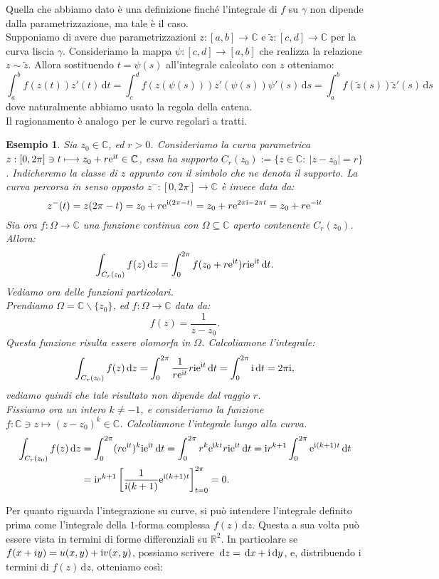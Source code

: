 \documentclass[11pt]{book}
\theoremstyle{Definizione}
\theoremstyle{TeoremaProposizioneLemmaCorollarioCongettura}
\theoremstyle{OsservazioneNotaEsempio}
\newtheorem{myes}{Esempio}[section]
\newcommand{\R}{\mathbb{R}}
\newcommand{\C}{\mathbb{C}}
\newcommand{\tolto}{\smallsetminus}
\renewcommand{\i}{\textup{i}}
\newcommand{\e}{\textup{e}}
\renewcommand{\d}{\mathrm{d}}
\newcommand{\dz}{\,\d z}
\newcommand{\dt}{\,\d t}
\newcommand{\ds}{\,\d s}
\newcommand{\dx}{\,\d x}
\newcommand{\dy}{\,\d y}
\begin{document}
\noindent
Quella che abbiamo dato è una definizione finché l'integrale di $f$ su $\gamma$ non dipende dalla parametrizzazione, ma tale è il caso.\\
Supponiamo di avere due parametrizzazioni $z:[a,b]\longrightarrow \C$ e $\widetilde{z}:[c,d]\longrightarrow \C$ per la curva liscia $\gamma$. Consideriamo la mappa $\psi:[c,d]\longrightarrow [a,b]$ che realizza la relazione $z\sim \widetilde{z}$. Allora sostituendo $t = \psi(s)$ all'integrale calcolato con $z$ otteniamo:
$$
\int_a^b f(z(t))z'(t) \dt = \int_c^d f(z(\psi(s)))z'(\psi(s))\psi'(s)\ds = \int_a^b f(\widetilde{z}(s)) \widetilde{z}'(s) \ds
$$
dove naturalmente abbiamo usato la regola della catena.\\
Il ragionamento è analogo per le curve regolari a tratti.
\begin{myes}
Sia $z_0\in \C$, ed $r > 0$. Consideriamo la curva parametrica $z:[0,2\pi]\ni t \longmapsto z_0 + r \e^{\i t}\in \C$, essa ha supporto $C_r(z_0) := \{z\in \C:\ |z-z_0| = r\}$. Indicheremo la classe di $z$ appunto con il simbolo che ne denota il supporto. La curva percorsa in senso opposto $z^-:[0,2\pi]\longrightarrow \C$ è invece data da:
$$
z^-(t) = z(2\pi-t) = z_0 + r\e^{\i(2\pi-t)} = z_0 + r\e^{2\pi\i - 2\pi t} = z_0+r\e^{-\i t}
$$
Sia ora $f:\Omega\longrightarrow \C$ una funzione continua con $\Omega\subseteq \C$ aperto contenente $C_r(z_0)$. Allora:
$$
\int_{C_r(z_0)} f(z)\dz = \int_{0}^{2\pi} f(z_0+r\e^{\i t}) r\i \e^{\i t} \dt.
$$
Vediamo ora delle funzioni particolari.\\
Prendiamo $\Omega = \C \tolto \{z_0\}$, ed $f:\Omega\longrightarrow \C$ data da:
$$
f(z) = \frac{1}{z-z_0}.
$$
Questa funzione risulta essere olomorfa in $\Omega$. Calcoliamone l'integrale:
$$
\int_{C_r(z_0)} f(z)\dz = \int_{0}^{2\pi} \frac{1}{r\e^{\i t}} r\i \e^{\i t}\dt = \int_{0}^{2\pi} \i \dt = 2\pi\i,
$$
vediamo quindi che tale risultato non dipende dal raggio $r$.\\
Fissiamo ora un intero $k \neq -1$, e consideriamo la funzione $f:\C \ni z \longmapsto (z-z_0)^k\in \C$. Calcoliamone l'integrale lungo alla curva.
\begin{align*}
\int_{C_r(z_0)} f(z)\dz &= \int_{0}^{2\pi} (r\e^{\i t})^k \i \e^{\i t} \dt = \int_{0}^{2\pi} r^k\e^{\i kt} r \i \e^{\i t} \dt = \i r^{k+1} \int_{0}^{2\pi} \e^{\i(k+1)t}\dt \\
&= \i r^{k+1}\left[\frac{1}{\i(k+1)}\e^{\i(k+1)t}\right]_{t = 0}^{2\pi} = 0.
\end{align*}
\end{myes}
Per quanto riguarda l'integrazione su curve, si può intendere l'integrale definito prima come l'integrale della $1$-forma complessa $f(z)\dz$. Questa a sua volta può essere vista in termini di forme differenziali su $\R^2$. In particolare se $f(x+iy) = u(x,y)+\i v(x,y)$, possiamo scrivere $\dz = \dx+\i\dy$, e, distribuendo i termini di $f(z)\dz$, otteniamo così:
\end{document}

